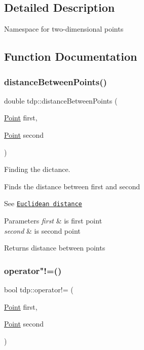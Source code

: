 \subsection{Detailed Description}
Namespace for two-\/dimensional points 

\subsection{Function Documentation}
\mbox{\label{namespacetdp_a05b1894339c9a02c1e9347d3dd6fd07a}} 
\subsubsection{\texorpdfstring{distance\+Between\+Points()}{distanceBetweenPoints()}}
{\footnotesize\ttfamily double tdp\+::distance\+Between\+Points (\begin{DoxyParamCaption}\item[{\mbox{\hyperlink{structtdp_1_1_point}{Point}}}]{first,  }\item[{\mbox{\hyperlink{structtdp_1_1_point}{Point}}}]{second }\end{DoxyParamCaption})}



Finding the dictance. 

Finds the distance between \textquotesingle{}first\textquotesingle{} and \textquotesingle{}second\textquotesingle{}

See \href{https://en.wikipedia.org/wiki/Euclidean_distance}{\tt Euclidean distance}


\begin{DoxyParams}{Parameters}
{\em first} & is first point \\
\hline
{\em second} & is second point \\
\hline
\end{DoxyParams}
\begin{DoxyReturn}{Returns}
distance between points 
\end{DoxyReturn}
\mbox{\label{namespacetdp_ab1602cb8c233d6ab4a5fa0e12dd219f1}} 
\subsubsection{\texorpdfstring{operator"!=()}{operator!=()}}
{\footnotesize\ttfamily bool tdp\+::operator!= (\begin{DoxyParamCaption}\item[{\mbox{\hyperlink{structtdp_1_1_point}{Point}}}]{first,  }\item[{\mbox{\hyperlink{structtdp_1_1_point}{Point}}}]{second }\end{DoxyParamCaption})}



